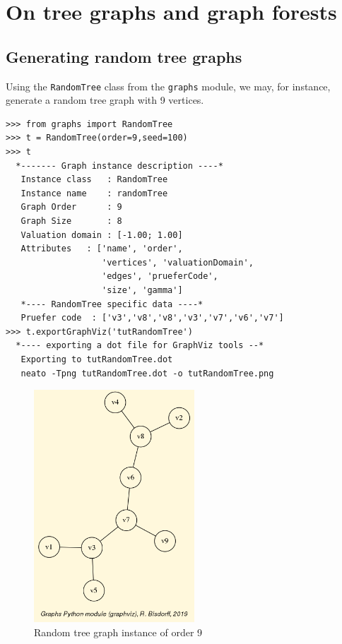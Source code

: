 \chapter{On tree graphs and graph forests}
\label{sec:23}

\abstract*{}

\abstract{}

\section{Generating random tree graphs}
\label{aec:23.1}

Using the \texttt{RandomTree} class from the \texttt{graphs} module, we may, for instance, generate a random tree graph with 9 vertices.
\begin{lstlisting}
>>> from graphs import RandomTree
>>> t = RandomTree(order=9,seed=100)
>>> t
  *------- Graph instance description ----*
   Instance class   : RandomTree
   Instance name    : randomTree
   Graph Order      : 9
   Graph Size       : 8
   Valuation domain : [-1.00; 1.00]
   Attributes   : ['name', 'order',
                   'vertices', 'valuationDomain',
                   'edges', 'prueferCode',
                   'size', 'gamma']
   *---- RandomTree specific data ----*
   Pruefer code  : ['v3','v8','v8','v3','v7','v6','v7']
>>> t.exportGraphViz('tutRandomTree')
  *---- exporting a dot file for GraphViz tools --*
   Exporting to tutRandomTree.dot
   neato -Tpng tutRandomTree.dot -o tutRandomTree.png
\end{lstlisting}
\begin{figure}[h]
\sidecaption
\includegraphics[width=6cm]{Figures/tutRandomTree.png}
\caption{Random tree graph instance of order 9} 
\label{fig:23.1}       %
\end{figure}

